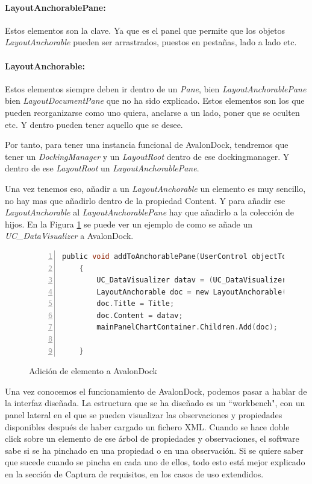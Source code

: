 \paragraph{LayoutAnchorablePane:} Estos elementos son la clave. Ya que es el panel que permite que los objetos
\emph{LayoutAnchorable} pueden ser arrastrados, puestos en pesta\~nas, lado a lado etc.

\paragraph{LayoutAnchorable:} Estos elementos siempre deben ir dentro de un \emph{Pane}, bien \emph{LayoutAnchorablePane}
bien \emph{LayoutDocumentPane} que no ha sido explicado. Estos elementos son los que pueden reorganizarse como uno quiera,
anclarse a un lado, poner que se oculten etc. Y dentro pueden tener aquello que se desee.

Por tanto, para tener una instancia funcional de AvalonDock, tendremos que tener un \emph{DockingManager} y un
\emph{LayoutRoot} dentro de ese dockingmanager. Y dentro de ese \emph{LayoutRoot} un \emph{LayoutAnchorablePane}.

Una vez tenemos eso, a\~nadir a un \emph{LayoutAnchorable} un elemento es muy sencillo, no hay mas que a\~nadirlo dentro de la
propiedad Content. Y para a\~nadir ese \emph{LayoutAnchorable} al \emph{LayoutAnchorablePane} hay que a\~nadirlo a la colecci\'on
de hijos. En la Figura \ref{AnadirHijoAvalonDock} se puede ver un ejemplo de como se a\~nade un \emph{UC\_DataVisualizer} a 
AvalonDock.

\begin{figure}[h]
    \begin{lstlisting}[tabsize=2, language=C, numbers=left, showspaces=false, breaklines=true]
    public void addToAnchorablePane(UserControl objectToAdd, string Title)
    {
        UC_DataVisualizer datav = (UC_DataVisualizer)objectToAdd;
        LayoutAnchorable doc = new LayoutAnchorable();
        doc.Title = Title;
        doc.Content = datav;
        mainPanelChartContainer.Children.Add(doc);

    }
    \end{lstlisting}
    \caption[Adici\'on de elemento a AvalonDock]{Adici\'on de elemento a AvalonDock}
    \label{AnadirHijoAvalonDock}
\end{figure}

Una vez conocemos el funcionamiento de AvalonDock, podemos pasar a hablar de la interfaz dise\~nada.
La estructura que se ha dise\~nado es un ``workbench", con un panel lateral en el que se pueden visualizar las observaciones
y propiedades disponibles despu\'es de haber cargado un fichero XML. Cuando se hace doble click sobre un elemento
de ese \'arbol de propiedades y observaciones, el software sabe si se ha pinchado en una propiedad o en una observaci\'on.
Si se quiere saber que sucede cuando se pincha en cada uno de ellos, todo esto est\'a mejor explicado en la secci\'on de
Captura de requisitos, en los casos de uso extendidos.

